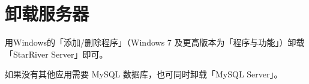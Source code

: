 \section{卸载服务器}\label{ux5378ux8f7dux670dux52a1ux5668}

用Windows的「添加/删除程序」（Windows 7 及更高版本为「程序与功能」）卸载
「StarRiver Server」即可。

如果没有其他应用需要 MySQL 数据库，也可同时卸载「MySQL Server」。
